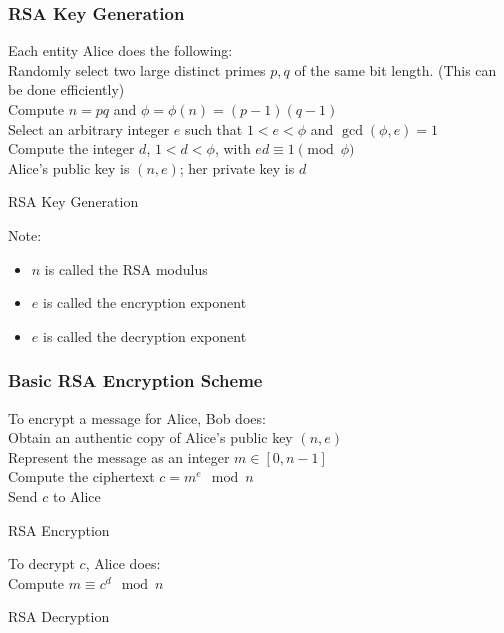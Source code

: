 \documentclass[12pt,titlepage]{article}
\begin{document}
\subsubsection{RSA Key Generation}
\begin{algorithm}
	Each entity Alice does the following: \\
	Randomly select two large distinct primes $p, q$ of the same bit length. (This can be done efficiently)\\
	Compute $n = pq$ and $\phi = \phi(n) = (p-1)(q-1)$\\
	Select an arbitrary integer $e$ such that $1 < e < \phi$ and $\gcd(\phi, e) = 1$\\
	Compute the integer $d$, $1 < d < \phi$, with $ed \equiv 1 \pmod \phi$\\
	Alice's public key is $(n, e)$; her private key is $d$
	\caption{RSA Key Generation}
\end{algorithm}
Note: \begin{itemize}
	\item $n$ is called the RSA modulus
	\item $e$ is called the encryption exponent
	\item $e$ is called the decryption exponent
\end{itemize}
\subsubsection{Basic RSA Encryption Scheme}
\begin{algorithm}
	To encrypt a message for Alice, Bob does: \\
	Obtain an authentic copy of Alice's public key $(n, e)$\\
	Represent the message as an integer $m \in [0, n-1]$\\
	Compute the ciphertext $c = m^e \mod n$\\
	Send $c$ to Alice
	\caption{RSA Encryption}
\end{algorithm}

\begin{algorithm}
	To decrypt $c$, Alice does: \\
	Compute $m \equiv c^d \mod n$ 
	\caption{RSA Decryption}
\end{algorithm}
\end{document}
